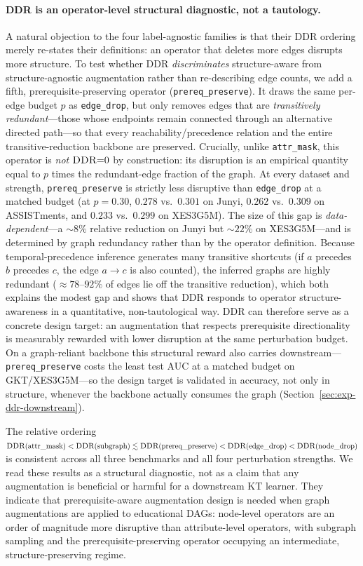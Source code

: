 \documentclass[pdflatex,sn-mathphys-num]{sn-jnl}
\newcommand{\DDR}{\textsc{DDR}}
\begin{document}
\paragraph{\DDR{} is an operator-level structural diagnostic, not a tautology.}
A natural objection to the four label-agnostic families is that their
\DDR{} ordering merely re-states their definitions: an operator that
deletes more edges disrupts more structure. To test whether \DDR{}
\emph{discriminates} structure-aware from structure-agnostic
augmentation rather than re-describing edge counts, we add a fifth,
prerequisite-preserving operator (\texttt{prereq\_preserve}). It draws
the same per-edge budget $p$ as \texttt{edge\_drop}, but only removes
edges that are \emph{transitively redundant}---those whose endpoints
remain connected through an alternative directed path---so that every
reachability/precedence relation and the entire transitive-reduction
backbone are preserved. Crucially, unlike \texttt{attr\_mask}, this
operator is \emph{not} $\DDR{=}0$ by construction: its disruption is an
empirical quantity equal to $p$ times the redundant-edge fraction of the
graph. At every dataset and strength, \texttt{prereq\_preserve} is
strictly less disruptive than \texttt{edge\_drop} at a matched budget
(at $p=0.30$, $0.278$ vs.\ $0.301$ on Junyi, $0.262$ vs.\ $0.309$ on
ASSISTments, and $0.233$ vs.\ $0.299$ on XES3G5M). The size of this gap
is \emph{data-dependent}---a $\sim 8\%$ relative reduction on Junyi but
$\sim 22\%$ on XES3G5M---and is determined by graph redundancy rather
than by the operator definition. Because temporal-precedence inference
generates many transitive shortcuts (if $a$ precedes $b$ precedes $c$,
the edge $a\!\to\!c$ is also counted), the inferred graphs are
highly redundant ($\approx 78$--$92\%$ of edges lie off the transitive
reduction), which both explains the modest gap and shows that \DDR{}
responds to operator structure-awareness in a quantitative,
non-tautological way. \DDR{} can therefore serve as a concrete design
target: an augmentation that respects prerequisite directionality is
measurably rewarded with lower disruption at the same perturbation
budget. On a graph-reliant backbone this structural reward also carries
downstream---\texttt{prereq\_preserve} costs the least test AUC at a matched
budget on GKT/XES3G5M---so the design target is validated in accuracy, not
only in structure, whenever the backbone actually consumes the graph
(Section~\ref{sec:exp-ddr-downstream}).

The relative ordering
$\DDR(\text{attr\_mask}) < \DDR(\text{subgraph}) \lesssim
\DDR(\text{prereq\_preserve}) < \DDR(\text{edge\_drop}) <
\DDR(\text{node\_drop})$
is consistent across all three benchmarks and all four perturbation
strengths. We read these results as a structural diagnostic, not as a
claim that any augmentation is beneficial or harmful for a downstream
KT learner. They indicate that prerequisite-aware augmentation design
is needed when graph augmentations are applied to educational DAGs:
node-level operators are an order of magnitude more disruptive than
attribute-level operators, with subgraph sampling and the
prerequisite-preserving operator occupying an intermediate,
structure-preserving regime.
\end{document}
